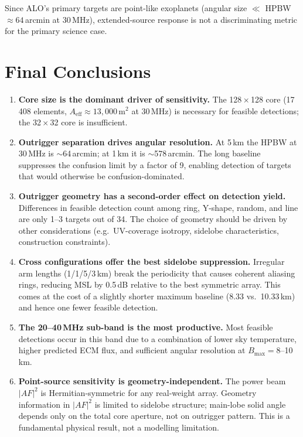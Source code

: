 \documentclass[12pt,a4paper]{article}
\begin{document}
Since ALO's primary targets are point-like exoplanets (angular size
$\ll$ HPBW $\approx 64$\,arcmin at 30\,MHz), extended-source response
is not a discriminating metric for the primary science case.

\section{Final Conclusions}
\label{sec:conclusions}

\begin{enumerate}
  \item \textbf{Core size is the dominant driver of sensitivity.}
    The 128\,$\times$\,128 core (17\,408 elements, $A_\mathrm{eff}
    \approx 13{,}000$\,m$^2$ at 30\,MHz) is necessary for feasible detections;
    the 32\,$\times$\,32 core is insufficient.

  \item \textbf{Outrigger separation drives angular resolution.}
    At 5\,km the HPBW at 30\,MHz is $\sim$64\,arcmin; at 1\,km it is
    $\sim$578\,arcmin.
    The long baseline suppresses the confusion limit by a factor of 9, enabling
    detection of targets that would otherwise be confusion-dominated.

  \item \textbf{Outrigger geometry has a second-order effect on detection yield.}
    Differences in feasible detection count among ring, Y-shape, random, and
    line are only 1--3 targets out of 34.
    The choice of geometry should be driven by other considerations (e.g.\
    UV-coverage isotropy, sidelobe characteristics, construction constraints).

  \item \textbf{Cross configurations offer the best sidelobe suppression.}
    Irregular arm lengths (1/1/5/3\,km) break the periodicity that causes
    coherent aliasing rings, reducing MSL by 0.5\,dB relative to the best
    symmetric array.
    This comes at the cost of a slightly shorter maximum baseline (8.33 vs.\
    10.33\,km) and hence one fewer feasible detection.

  \item \textbf{The 20--40\,MHz sub-band is the most productive.}
    Most feasible detections occur in this band due to a combination of lower
    sky temperature, higher predicted ECM flux, and sufficient angular resolution
    at $B_\mathrm{max} = 8$--10\,km.

  \item \textbf{Point-source sensitivity is geometry-independent.}
    The power beam $|AF|^2$ is Hermitian-symmetric for any real-weight array.
    Geometry information in $|AF|^2$ is limited to sidelobe structure; main-lobe
    solid angle depends only on the total core aperture, not on outrigger pattern.
    This is a fundamental physical result, not a modelling limitation.
\end{enumerate}
\end{document}
